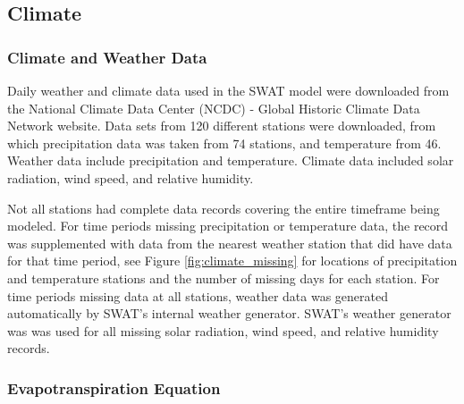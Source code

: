 \subsection{Climate}	\label{sec:climate}

\subsubsection{Climate and Weather Data}

Daily weather and climate data used in the SWAT model were downloaded from the National Climate Data Center (NCDC) - Global Historic Climate Data Network website.  Data sets from 120 different stations were downloaded, from which precipitation data was taken from 74 stations, and temperature from 46.  Weather data include precipitation and temperature.  Climate data included solar radiation, wind speed, and relative humidity.  

Not all stations had complete data records covering the entire timeframe being modeled.  For time periods missing precipitation or temperature data, the record was supplemented with data from the nearest weather station that did have data for that time period, see Figure \ref{fig:climate_missing} for locations of precipitation and temperature stations and the number of missing days for each station.   For time periods missing data at all stations, weather data was generated automatically by SWAT's internal weather generator.  SWAT's weather generator was was used for all missing solar radiation, wind speed, and relative humidity records. 

\subsubsection{Evapotranspiration Equation}

